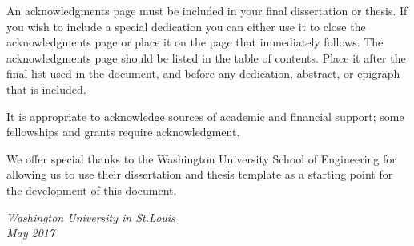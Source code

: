 \thesisacknowledgments

An acknowledgments page must be included in your final dissertation or thesis.  If you wish to
include a special dedication you can either use it to close the acknowledgments page or place it on
the page that immediately follows.  The acknowledgments page should be listed in the table of
contents.  Place it after the final list used in the document, and before any dedication, abstract,
or epigraph that is included.

It is appropriate to acknowledge sources of academic and financial support; some fellowships and
grants require acknowledgment.

We offer special thanks to the Washington University School of Engineering for allowing us to use
their dissertation and thesis template as a starting point for the development of this document.

\null\hfill \thesisauthor

\noindent
\textit{Washington University in St.\@ Louis}\\
\textit{May 2017}
